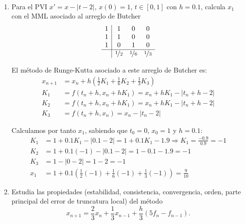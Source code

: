\begin{ejercicio}~
    \begin{enumerate}
        \item Para el PVI $x' = x - |t - 2|$, $x(0) = 1$, $t \in [0, 1]$ con $h = 0.1$, calcula $x_1$ con el MML asociado al arreglo de Butcher
            \begin{equation*}
                \begin{array}{c|ccc}
                    1 & 1 & 0 & 0 \\
                    1 & 1 & 0 & 0 \\
                    1 & 0 & 1 & 0 \\ \hline
                    & \nicefrac{1}{2} & \nicefrac{1}{6} & \nicefrac{1}{3}
                \end{array}
            \end{equation*}

            El método de Runge-Kutta asociado a este arreglo de Butcher es:
            \begin{align*}
                x_{n+1} &= x_n + h \left( \frac{1}{2} K_1 + \frac{1}{6} K_2 + \frac{1}{3} K_3 \right) \\
                K_1 &= f(t_n + h, x_n + h K_1) = x_n + h K_1 - |t_n + h - 2| \\
                K_2 &= f(t_n + h, x_n + h K_1) = x_n + h K_1 - |t_n + h - 2| \\
                K_3 &= f(t_n + h, x_n) = x_n - |t_n - 2|
            \end{align*}

            Calculamos por tanto $x_1$, sabiendo que $t_0 = 0$, $x_0 = 1$ y $h = 0.1$:
            \begin{align*}
                K_1 &= 1 + 0.1 K_1 - |0.1 - 2| = 1 + 0.1 K_1 - 1.9 
                \Longrightarrow K_1 = \frac{-0.9}{0.9} = -1 \\
                K_2 &= 1 + 0.1(-1) - |0.1 - 2| = 1 - 0.1 - 1.9 = -1 \\
                K_3 &= 1 - |0 - 2| = 1 - 2 = -1\\
                x_1 &= 1 + 0.1 \left( \frac{1}{2}(-1) + \frac{1}{6}(-1) + \frac{1}{3}(-1) \right) = \frac{9}{10}
            \end{align*}
        \item Estudia las propiedades (estabilidad, consistencia, convergencia, orden, parte principal del error de truncatura local) del método
        \begin{equation*}
            x_{n+1} = \frac{2}{3} x_n + \frac{1}{3} x_{n-1} + \frac{h}{3} (5 f_n - f_{n-1}).
        \end{equation*}


\end{enumerate}
\end{ejercicio}
